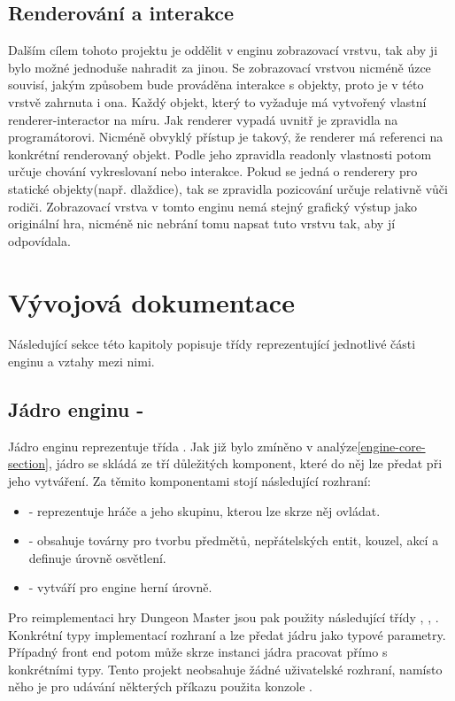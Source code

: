 \section{Renderování a interakce}\label{renderer-interactor}
Dalším cílem tohoto projektu je oddělit v enginu zobrazovací vrstvu, tak aby ji bylo možné jednoduše nahradit za jinou.
Se zobrazovací vrstvou nicméně úzce souvisí, jakým způsobem bude prováděna interakce s objekty, proto je v této vrstvě zahrnuta i ona. 
Každý objekt, který to vyžaduje má vytvořený vlastní renderer-interactor na míru. Jak renderer vypadá uvnitř je zpravidla na programátorovi. 
Nicméně obvyklý přístup je takový, že renderer má referenci na konkrétní renderovaný objekt. Podle jeho zpravidla readonly vlastnosti potom určuje
chování vykreslovaní nebo interakce. Pokud se jedná o renderery pro statické objekty(např. dlaždice), tak se zpravidla pozicování určuje relativně
vůči rodiči. Zobrazovací vrstva v tomto enginu nemá stejný grafický výstup jako originální hra, nicméně nic nebrání tomu napsat 
 tuto vrstvu tak, aby jí odpovídala.

\chapter{Vývojová dokumentace}
Následující sekce této kapitoly popisuje třídy reprezentující jednotlivé části enginu a vztahy mezi nimi.

\section{Jádro enginu - }
Jádro enginu reprezentuje třída . Jak již bylo zmíněno v analýze\vref{engine-core-section}, jádro
se skládá ze tří důležitých komponent, které do něj lze předat při jeho vytváření. 
Za těmito komponentami stojí následující rozhraní:

\begin{itemize}
\item {} - reprezentuje hráče a jeho skupinu, kterou lze skrze něj ovládat.
\item {} - obsahuje továrny pro tvorbu předmětů, nepřátelských entit, kouzel, akcí a definuje úrovně osvětlení.
\item {} - vytváří pro engine herní úrovně.
\end{itemize}

Pro reimplementaci hry Dungeon Master jsou pak použity následující třídy ,
, . Konkrétní typy implementací rozhraní
 a  lze předat jádru jako typové parametry.
Případný front end potom může skrze instanci jádra pracovat přímo s konkrétními typy. Tento projekt
neobsahuje žádné uživatelské rozhraní, namísto něho je pro udávání některých příkazu použita konzole .

